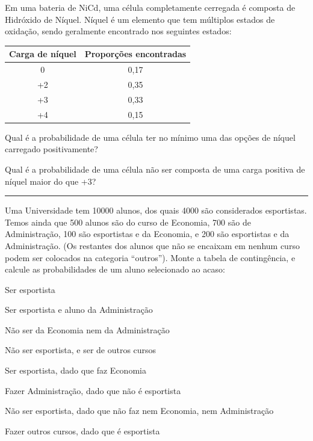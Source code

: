 \documentclass[a4paper,11pt,fleqn]{article}\usepackage[]{graphicx}\usepackage[]{color}
\theoremstyle{definition}
\begin{document}
\begin{compactenum}
\item Em uma bateria de NiCd,  uma célula completamente cerregada é
  composta de Hidróxido de Níquel. Níquel é um elemento que tem
  múltiplos estados de oxidação, sendo geralmente encontrado nos
  seguintes estados:
  \begin{table}[!h]
    \centering
    \begin{tabular}{cc}
      \hline
      \textbf{Carga de níquel}
      & \textbf{Proporções encontradas} \\
      \hline
      0 & 0,17 \\
      +2 & 0,35 \\
      +3 & 0,33 \\
      +4 & 0,15 \\
      \hline
    \end{tabular}
  \end{table}
  \begin{compactenum}
  \item Qual é a probabilidade de uma célula ter no mínimo uma das
    opções de níquel carregado positivamente?
  \item Qual é a probabilidade de uma célula não ser composta de uma
    carga positiva de níquel maior do que +3?
  \end{compactenum}

\vspace{0.3cm}
\hrule
\vspace{0.3cm}

\item Uma Universidade tem 10000 alunos, dos quais 4000 são considerados
  esportistas. Temos ainda que 500 alunos são do curso de Economia, 700
  são de Administração, 100 são esportistas e da Economia, e 200 são
  esportistas e da Administração. (Os restantes dos alunos que não se
  encaixam em nenhum curso podem ser colocados na categoria
  ``outros''). Monte a tabela de contingência, e calcule as
  probabilidades de um aluno selecionado ao acaso:
  \begin{compactenum}
  \item Ser esportista
  \item Ser esportista e aluno da Administração
  \item Não ser da Economia nem da Administração
  \item Não ser esportista, e ser de outros cursos
  \item Ser esportista, dado que faz Economia
  \item Fazer Administração, dado que não é esportista
  \item Não ser esportista, dado que não faz nem Economia, nem
    Administração
  \item Fazer outros cursos, dado que é esportista
  \end{compactenum}


\end{compactenum}
\end{document}
